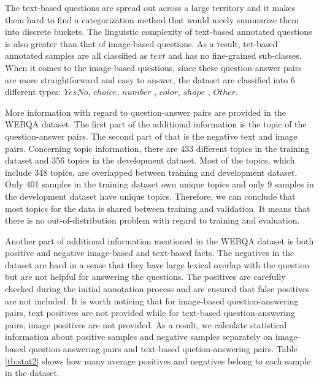 \documentclass[nohyperref]{article}
\theoremstyle{plain}
\theoremstyle{definition}
\theoremstyle{remark}
\begin{document}
    The text-based questions are spread out across a large territory and it makes them hard to find a categorization method that would nicely summarize them into discrete buckets. The linguistic complexity of text-based annotated questions is also greater than that of image-based questions. As a result, tet-based annotated samples are all classified as $\mathit{text}$ and has no fine-grained sub-classes. When it comes to the image-based questions, since these question-answer pairs are more straightforward and easy to answer, the dataset are classified into 6 different types: $\mathit{YesNo}$, $\mathit{choice}$, $\mathit{number}$ , $\mathit{color}$, $\mathit{shape}$ , $\mathit{Other}$.

    More information with regard to question-answer pairs are provided in the WEBQA dataset. The first part of the additional information is the topic of the question-answer pairs. The second part of that is the negative text and image pairs. Concerning topic information, there are 433 different topics in the training dataset and 356 topics in the development dataset. Most of the topics, which include 348 topics, are overlapped between training and development dataset. Only 401 samples in the training dataset own unique topics and only 9 samples in the development dataset have unique topics. Therefore, we can conclude that most topics for the data is shared between training and validation. It means that there is no out-of-distribution problem with regard to training and evaluation.

    Another part of additional information mentioned in the WEBQA dataset is both positive and negative image-based and text-based facts. The negatives in the dataset are hard in a sense that they have large lexical overlap with the question but are not helpful for answering the questions. The positives are carefully checked during the initial annotation process and are ensured that false positives are not included. It is worth noticing that for image-based question-answering pairs, text positives are not provided while for text-based question-answering pairs, image positives are not provided. As a result, we calculate statistical information about positive samples and negative samples separately on image-based question-answering pairs and text-based quetion-answering pairs. Table \ref{tb:stat2} shows how many average positives and negatives belong to each sample in the dataset.
\end{document}
